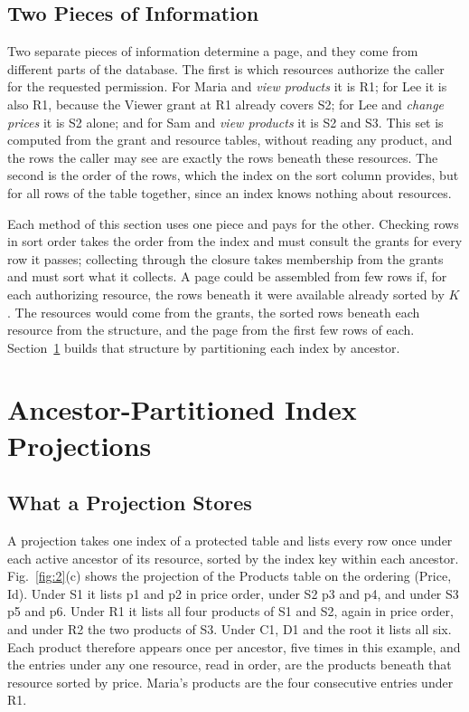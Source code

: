 \documentclass[conference]{IEEEtran}
\begin{document}
\subsection{Two Pieces of Information}\label{sec-3-4}

Two separate pieces of information determine a page, and they come from different parts of the database. The first is which resources authorize the caller for the requested permission. For Maria and \emph{view products} it is R1; for Lee it is also R1, because the Viewer grant at R1 already covers S2; for Lee and \emph{change prices} it is S2 alone; and for Sam and \emph{view products} it is S2 and S3. This set is computed from the grant and resource tables, without reading any product, and the rows the caller may see are exactly the rows beneath these resources. The second is the order of the rows, which the index on the sort column provides, but for all rows of the table together, since an index knows nothing about resources.

Each method of this section uses one piece and pays for the other. Checking rows in sort order takes the order from the index and must consult the grants for every row it passes; collecting through the closure takes membership from the grants and must sort what it collects. A page could be assembled from few rows if, for each authorizing resource, the rows beneath it were available already sorted by \(K\). The resources would come from the grants, the sorted rows beneath each resource from the structure, and the page from the first few rows of each. Section~\ref{sec-4} builds that structure by partitioning each index by ancestor.

\section{Ancestor-Partitioned Index Projections}\label{sec-4}

\subsection{What a Projection Stores}\label{sec-4-1}

A projection takes one index of a protected table and lists every row once under each active ancestor of its resource, sorted by the index key within each ancestor. Fig.~\ref{fig:2}(c) shows the projection of the Products table on the ordering (Price, Id). Under S1 it lists p1 and p2 in price order, under S2 p3 and p4, and under S3 p5 and p6. Under R1 it lists all four products of S1 and S2, again in price order, and under R2 the two products of S3. Under C1, D1 and the root it lists all six. Each product therefore appears once per ancestor, five times in this example, and the entries under any one resource, read in order, are the products beneath that resource sorted by price. Maria's products are the four consecutive entries under R1.
\end{document}
